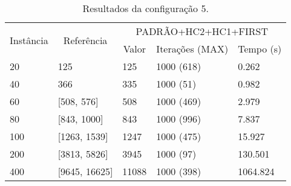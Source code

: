 \documentclass{MO824}
\begin{document}
\begin{table}[htp!]
\centering
\caption{Resultados da configuração 5.}
\label{table:conf5}
\begin{tabular}{|l|l|l|l|l|}
\hline
\multicolumn{1}{|c|}{\multirow{2}{*}{Instância}} & \multicolumn{1}{|c|}{\multirow{2}{*}{Referência}} & \multicolumn{3}{c|}{PADRÃO+HC2+HC1+FIRST }                                                    \\ \cline{3-5} 
\multicolumn{1}{|c|}{} & \multicolumn{1}{|c|}{}                           & \multicolumn{1}{c|}{Valor} & \multicolumn{1}{c|}{Iterações (MAX)} & \multicolumn{1}{c|}{Tempo (s)} \\ \hline
20            & 125                                   & 125                        & 1000 (618)                           & 0.262                      \\ \hline
40            & 366                                     & 335                        & 1000 (51)                            & 0.982                      \\ \hline
60            & [508, 576]                                   & 508                        & 1000 (469)                           & 2.979                      \\ \hline
80           & [843, 1000]                                    & 843                        & 1000 (996)                           & 7.837                      \\ \hline
100          & [1263, 1539]                                    & 1247                       & 1000 (475)                           & 15.927                     \\ \hline
200          & [3813, 5826]                                    & 3945                       & 1000 (97)                            & 130.501                    \\ \hline
400          & [9645, 16625]                                    & 11088                      & 1000 (398)                           & 1064.824                   \\ \hline
\end{tabular}
\end{table}

\clearpage
\end{document}

